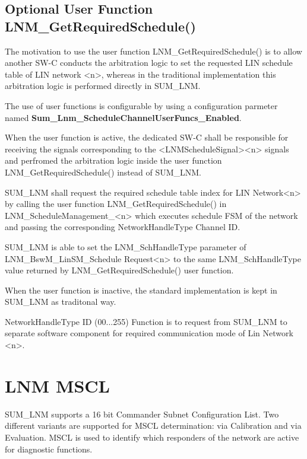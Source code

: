 \subsection{Optional User Function LNM_GetRequiredSchedule()}
\label{subsec:usrfunc_schedule}
{
The motivation to use the user function LNM_GetRequiredSchedule() is to allow another SW-C conducts the arbitration logic to set the requested LIN schedule table of LIN network <n>, whereas in the traditional implementation this arbitration logic is performed directly in SUM_LNM.

The use of user functions is configurable by using a configuration parmeter named \textbf{Sum_Lnm_ScheduleChannelUserFuncs_Enabled}.

When the user function is active, the dedicated SW-C shall be responsible for receiving the signals corresponding to the <LNMScheduleSignal><n> signals and perfromed the arbitration logic inside the user function LNM_GetRequiredSchedule() instead of SUM_LNM.

SUM_LNM shall request the required schedule table index for LIN Network<n> by calling the user function LNM_GetRequiredSchedule() in LNM_ScheduleManagement_<n> which executes schedule FSM of the network and passing the corresponding NetworkHandleType Channel ID.

SUM_LNM is able to set the LNM_SchHandleType parameter of LNM_BswM_LinSM_Schedule Request<n> to the same LNM_SchHandleType value returned by LNM_GetRequiredSchedule() user function.

When the user function is inactive, the standard implementation is kept in SUM_LNM as traditonal way.
}
{}

{
{NetworkHandleType ID (00...255)}
{}
{}
{}
{Function is to request from SUM_LNM to separate software component for required communication mode of Lin Network <n>.}
}
{}

\section {LNM MSCL}
\label{sec:MSCL}
{
SUM_LNM supports a 16 bit Commander Subnet Configuration List. Two different variants are supported for MSCL determination: via Calibration and via Evaluation. MSCL is used to identify which responders of the network are active
for diagnostic functions.
}
{}

